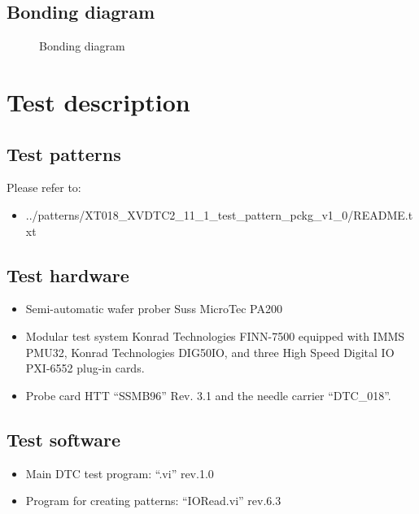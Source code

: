 
\newpage
\section{Bonding diagram}

\vskip -5mm
\begin{figure}[h!]
\caption{ Bonding diagram \CHIPID}
\vskip -7mm
\label{toplevel}
\end{figure}


\chapter{Test description}

\section{Test patterns}

Please refer to:
\begin{itemize}
\item ../patterns/XT018\_XVDTC2\_11\_1\_test\_pattern\_pckg\_v1\_0/README.txt
\end{itemize}



\section{Test hardware}

\begin{itemize}
\item Semi-automatic wafer prober Suss MicroTec PA200
\item Modular test system Konrad Technologies FINN-7500 equipped with IMMS PMU32, Konrad Technologies DIG50IO, and three High Speed Digital IO PXI-6552 plug-in cards. 
\item Probe card HTT “SSMB96” Rev. 3.1 and the needle carrier “DTC\_018”.
\end{itemize}

\section{Test software}
\begin{itemize}
\item Main DTC test program: “\CHIPID.vi” rev.1.0
\item Program for creating patterns: “IORead.vi” rev.6.3 
\end{itemize}

